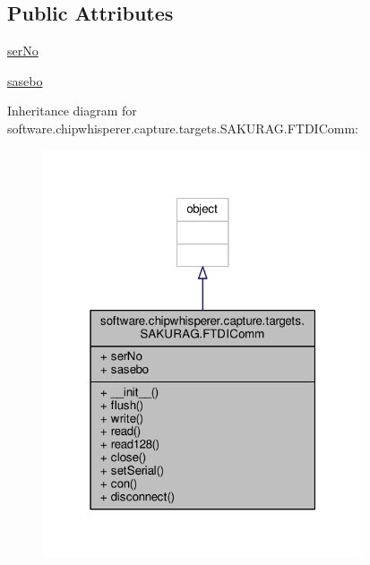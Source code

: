 \subsection*{Public Attributes}
\begin{DoxyCompactItemize}
\item 
\hyperlink{classsoftware_1_1chipwhisperer_1_1capture_1_1targets_1_1SAKURAG_1_1FTDIComm_a400f95b1ba513c324fa31534dfee4994}{ser\+No}
\item 
\hyperlink{classsoftware_1_1chipwhisperer_1_1capture_1_1targets_1_1SAKURAG_1_1FTDIComm_a55c8068d1ad5ec6e257237cf5dabf5b9}{sasebo}
\end{DoxyCompactItemize}


Inheritance diagram for software.\+chipwhisperer.\+capture.\+targets.\+S\+A\+K\+U\+R\+A\+G.\+F\+T\+D\+I\+Comm\+:\nopagebreak
\begin{figure}[H]
\begin{center}
\leavevmode
\includegraphics[width=268pt]{de/dea/classsoftware_1_1chipwhisperer_1_1capture_1_1targets_1_1SAKURAG_1_1FTDIComm__inherit__graph}
\end{center}
\end{figure}


